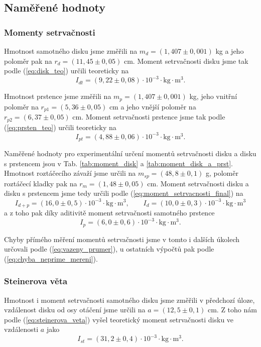 \documentclass[english]{article}
\newcommand{\unit}[1]{\mathrm{#1}}
\begin{document}
\subsection{Naměřené hodnoty}
		
	\subsubsection{Momenty setrvačnosti}
		Hmotnost samotného disku jsme změřili na $m_d=(1,407\pm0,001)$ kg a jeho poloměr pak na $r_d=(11,45\pm0,05)$ cm. Moment setrvačnosti disku jsme tak podle (\ref{eq:disk_teo}) určili teoreticky na 
		\begin{equation}
			I_{dt} = (9,22\pm0,08) \cdot \unit{10^{-3} \cdot kg \cdot m^3}.
		\end{equation}

		Hmotnost prstence jsme změřili na $m_p=(1,407\pm0,001)$ kg, jeho vnitřní poloměr na $r_{p1}=(5,36\pm0,05)$ cm a jeho vnější poloměr na $r_{p2}=(6,37\pm0,05)$ cm. Moment setrvačnosti prstence jsme tak podle (\ref{eq:prsten_teo}) určili teoreticky na 
		\begin{equation}
			I_{pt} = (4,88\pm0,06) \cdot \unit{10^{-3} \cdot kg \cdot m^3}.
		\end{equation}
		
		Naměřené hodnoty pro experimentální určení momentů setrvačnosti disku a disku s prstencem jsou v Tab. \ref{tab:moment_disk} a \ref{tab:moment_disk_a_prst}. Hmotnost roztáčecího závaží jsme určili na $m_{sp} = (48,8\pm0,1)$ g, poloměr roztáčecí kladky pak na $r_m = (1,48\pm0,05)$ cm.  Moment setrvačnosti disku a disku s prstencem jsme tedy určili podle (\ref{eq:moment_setrvacnosti_final}) na
		\begin{equation}
			I_{d+p} = (16,0\pm0,5) \cdot \unit{10^{-3} \cdot kg \cdot m^3}, \qquad 
			I_{d} = (10,0\pm0,3) \cdot \unit{10^{-3} \cdot kg \cdot m^3}
		\end{equation}
		a z toho pak díky aditivitě moment setrvačnosti samotného prstence		
		\begin{equation}
			I_{p} = (6,0\pm0,6) \cdot \unit{10^{-3} \cdot kg \cdot m^3}.
		\end{equation}
		
		Chyby přímého měření momentů setrvačnosti jsme v tomto i dalších úkolech určovali podle (\ref{eq:vazeny_prumer}), u ostatních výpočtů pak podle (\ref{eq:chyba_neprime_mereni}).
				
	\subsubsection{Steinerova věta}
		Hmotnost i moment setrvačnosti samotného disku jsme změřili v předchozí úloze, vzdálenost disku od osy otáčení jsme určili na $a=(12,5\pm0,1)$ cm. Z toho nám podle (\ref{eq:steinerova_veta}) vyšel teoretický moment setrvačnosti disku ve vzdálenosti $a$ jako 
		\begin{equation}
			I_{st} = (31,2\pm0,4) \cdot \unit{10^{-3} \cdot kg \cdot m^3}.
		\end{equation}
		
\end{document}
